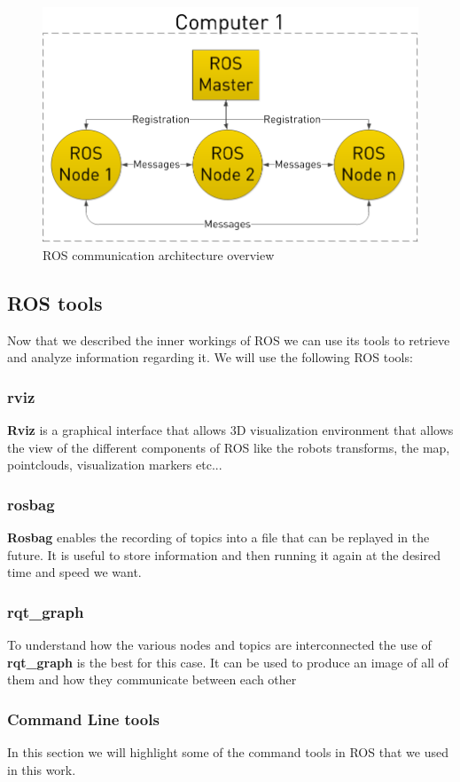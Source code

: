 \begin{figure}[ht!] 
\centerline{\includegraphics [width=0.8 \textwidth]{imgs/chapter3/rosgraph.png}}
\caption[ROS communication architecture overview]{ROS communication architecture overview \cite{rosbasics}}
\label{fig:rosgraph}
\end{figure}


\subsection{ROS tools}
Now that we described the inner workings of \ac{ROS} we can use its tools to retrieve and analyze information regarding it. We will use the following \ac{ROS} tools:
\subsubsection{rviz}
\textbf{Rviz} is a graphical interface that allows 3D visualization environment that allows the view of the different components of \ac{ROS} like the robots transforms, the map, pointclouds, visualization markers etc...
\subsubsection{rosbag}
\textbf{Rosbag} enables the recording of topics into a file that can be replayed in the future. It is useful to store information and then running it again at the desired time and speed we want.
\subsubsection{rqt_graph}
To understand how the various nodes and topics are interconnected the use of \textbf{rqt_graph} is the best for this case. It can be used to produce an image of all of them and how they communicate between each other
\subsubsection{Command Line tools}
In this section we will highlight some of the command tools in \ac{ROS} that we used in this work.
